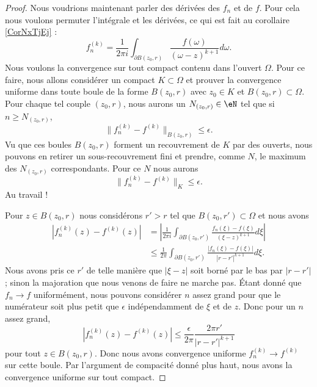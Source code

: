 \begin{proof}
    Nous voudrions maintenant parler des dérivées des \( f_n\) et de \( f\). Pour cela nous voulons permuter l'intégrale et les dérivées, ce qui est fait au corollaire \ref{CorNxTjEj} :
    \begin{equation}
        f_n^{(k)}=\frac{1}{ 2\pi i }\int_{\partial B(z_0,r)}\frac{ f(\omega) }{ (\omega-z)^{k+1} }d\omega.
    \end{equation}
    Nous voulons la convergence sur tout compact contenu dans l'ouvert \( \Omega\). Pour ce faire, nous allons considérer un compact \( K\subset \Omega\) et prouver la convergence uniforme dans toute boule de la forme \( B(z_0,r)\) avec \( z_0\in K\) et \( B(z_0,r)\subset \Omega\). Pour chaque tel couple \( (z_0,r)\), nous aurons un \( N_{(z_0,r)}\in \eN\) tel que si \( n\geq N_{(z_0,r)}\),
    \begin{equation}
        \| f_n^{(k)}-f^{(k)} \|_{B(z_0,r)}\leq \epsilon.
    \end{equation}
    Vu que ces boules \( B(z_0,r)\) forment un recouvrement de \( K\) par des ouverts, nous pouvons en retirer un sous-recouvrement fini et prendre, comme \( N\), le maximum des \( N_{(z_0,r)}\) correspondants. Pour ce \( N\) nous aurons
    \begin{equation}
        \| f_n^{(k)}-f^{(k)} \|_K\leq \epsilon.
    \end{equation}
    Au travail !

    Pour \( z\in B(z_0,r)\) nous considérons \( r'>r\) tel que \( B(z_0,r')\subset \Omega\) et nous avons
    \begin{subequations}
        \begin{align}
            | f^{(k)}_n(z)-f^{(k)}(z) |&=\left| \frac{1}{ 2\pi i }\int_{\partial B(z_0,r')}\frac{ f_n(\xi)-f(\xi) }{ (\xi-z)^{k+1} }d\xi \right| \\
            &\leq\frac{1}{ 2\pi }\int_{\partial B(z_0,r')}\frac{ | f_n(\xi)-f(\xi) | }{ | r-r' |^{k+1} }d\xi.
        \end{align}
    \end{subequations}
    Nous avons pris ce \( r'\) de telle manière que \( | \xi-z |\) soit borné par le bas par \( | r-r' |\); sinon la majoration que nous venons de faire ne marche pas. Étant donné que \( f_n\to f\) uniformément, nous pouvons considérer \( n\) assez grand pour que le numérateur soit plus petit que \( \epsilon\) indépendamment de \( \xi\) et de \( z\). Donc pour un \( n\) assez grand,
    \begin{equation}
        | f^{(k)}_n(z)-f^{(k)}(z) |\leq \frac{ \epsilon }{ 2\pi }\frac{ 2\pi r' }{ | r-r' |^{k+1} }
    \end{equation}
    pour tout \( z\in B(z_0,r)\). Donc nous avons convergence uniforme \( f_n^{(k)}\to f^{(k)}\) sur cette boule. Par l'argument de compacité donné plus haut, nous avons la convergence uniforme sur tout compact.
\end{proof}

